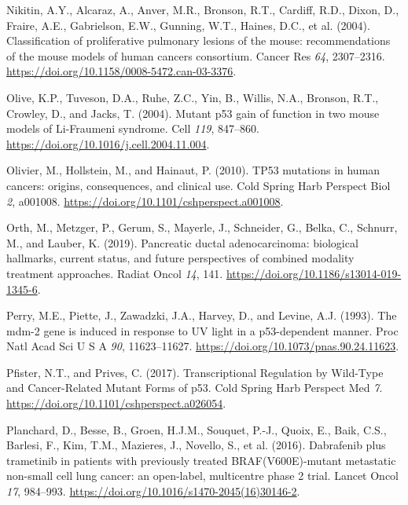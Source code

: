 \begin{CSLReferences}{0}{0}
\leavevmode{}%
Nikitin, A.Y., Alcaraz, A., Anver, M.R., Bronson, R.T., Cardiff, R.D., Dixon, D., Fraire, A.E., Gabrielson, E.W., Gunning, W.T., Haines, D.C., et al. (2004). Classification of proliferative pulmonary lesions of the mouse: recommendations of the mouse models of human cancers consortium. Cancer Res \emph{64}, 2307--2316. \url{https://doi.org/10.1158/0008-5472.can-03-3376}.

\leavevmode{}%
Olive, K.P., Tuveson, D.A., Ruhe, Z.C., Yin, B., Willis, N.A., Bronson, R.T., Crowley, D., and Jacks, T. (2004). Mutant p53 gain of function in two mouse models of Li-Fraumeni syndrome. Cell \emph{119}, 847--860. \url{https://doi.org/10.1016/j.cell.2004.11.004}.

\leavevmode{}%
Olivier, M., Hollstein, M., and Hainaut, P. (2010). TP53 mutations in human cancers: origins, consequences, and clinical use. Cold Spring Harb Perspect Biol \emph{2}, a001008. \url{https://doi.org/10.1101/cshperspect.a001008}.

\leavevmode{}%
Orth, M., Metzger, P., Gerum, S., Mayerle, J., Schneider, G., Belka, C., Schnurr, M., and Lauber, K. (2019). Pancreatic ductal adenocarcinoma: biological hallmarks, current status, and future perspectives of combined modality treatment approaches. Radiat Oncol \emph{14}, 141. \url{https://doi.org/10.1186/s13014-019-1345-6}.

\leavevmode{}%
Perry, M.E., Piette, J., Zawadzki, J.A., Harvey, D., and Levine, A.J. (1993). The mdm-2 gene is induced in response to UV light in a p53-dependent manner. Proc Natl Acad Sci U S A \emph{90}, 11623--11627. \url{https://doi.org/10.1073/pnas.90.24.11623}.

\leavevmode{}%
Pfister, N.T., and Prives, C. (2017). Transcriptional Regulation by Wild-Type and Cancer-Related Mutant Forms of p53. Cold Spring Harb Perspect Med \emph{7}. \url{https://doi.org/10.1101/cshperspect.a026054}.

\leavevmode{}%
Planchard, D., Besse, B., Groen, H.J.M., Souquet, P.-J., Quoix, E., Baik, C.S., Barlesi, F., Kim, T.M., Mazieres, J., Novello, S., et al. (2016). Dabrafenib plus trametinib in patients with previously treated BRAF(V600E)-mutant metastatic non-small cell lung cancer: an open-label, multicentre phase 2 trial. Lancet Oncol \emph{17}, 984--993. \url{https://doi.org/10.1016/s1470-2045(16)30146-2}.


\end{CSLReferences}
